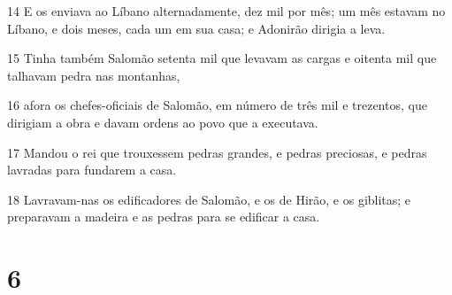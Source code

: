 \par 14 E os enviava ao Líbano alternadamente, dez mil por mês; um mês estavam no Líbano, e dois meses, cada um em sua casa; e Adonirão dirigia a leva.
\par 15 Tinha também Salomão setenta mil que levavam as cargas e oitenta mil que talhavam pedra nas montanhas,
\par 16 afora os chefes-oficiais de Salomão, em número de três mil e trezentos, que dirigiam a obra e davam ordens ao povo que a executava.
\par 17 Mandou o rei que trouxessem pedras grandes, e pedras preciosas, e pedras lavradas para fundarem a casa.
\par 18 Lavravam-nas os edificadores de Salomão, e os de Hirão, e os giblitas; e preparavam a madeira e as pedras para se edificar a casa.

\chapter{6}

